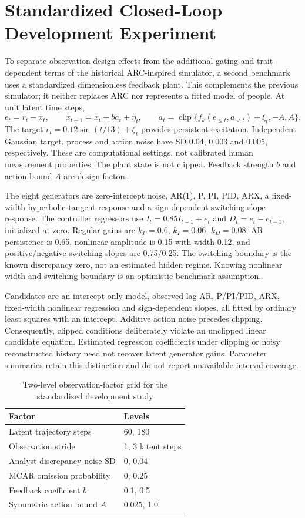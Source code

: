 \section{Standardized Closed-Loop Development Experiment}

To separate observation-design effects from the additional gating and trait-dependent terms of the historical ARC-inspired simulator, a second benchmark uses a standardized dimensionless feedback plant. This complements the previous simulator; it neither replaces ARC nor represents a fitted model of people. At unit latent time steps,
\[
 e_t=r_t-x_t,\qquad x_{t+1}=x_t+b a_t+\eta_t,\qquad
 a_t=\operatorname{clip}\{f_k(e_{\leq t},a_{<t})+\xi_t,-A,A\}.
\]
The target $r_t=0.12\sin(t/13)+\zeta_t$ provides persistent excitation. Independent Gaussian target, process and action noise have SD 0.04, 0.003 and 0.005, respectively. These are computational settings, not calibrated human measurement properties. The plant state is not clipped. Feedback strength $b$ and action bound $A$ are design factors.

The eight generators are zero-intercept noise, AR(1), P, PI, PID, ARX, a fixed-width hyperbolic-tangent response and a sign-dependent switching-slope response. The controller regressors use $I_t=0.85I_{t-1}+e_t$ and $D_t=e_t-e_{t-1}$, initialized at zero. Regular gains are $k_P=0.6$, $k_I=0.06$, $k_D=0.08$; AR persistence is 0.65, nonlinear amplitude is 0.15 with width 0.12, and positive/negative switching slopes are 0.75/0.25. The switching boundary is the known discrepancy zero, not an estimated hidden regime. Knowing nonlinear width and switching boundary is an optimistic benchmark assumption.

Candidates are an intercept-only model, observed-lag AR, P/PI/PID, ARX, fixed-width nonlinear regression and sign-dependent slopes, all fitted by ordinary least squares with an intercept. Additive action noise precedes clipping. Consequently, clipped conditions deliberately violate an unclipped linear candidate equation. Estimated regression coefficients under clipping or noisy reconstructed history need not recover latent generator gains. Parameter summaries retain this distinction and do not report unavailable interval coverage.

\begin{table}[htbp]
\centering
\caption{Two-level observation-factor grid for the standardized development study}
\label{tab:m02-development-design}
\begin{tabular}{ll}
\toprule
Factor & Levels \\
\midrule
Latent trajectory steps & 60, 180 \\
Observation stride & 1, 3 latent steps \\
Analyst discrepancy-noise SD & 0, 0.04 \\
MCAR omission probability & 0, 0.25 \\
Feedback coefficient $b$ & 0.1, 0.5 \\
Symmetric action bound $A$ & 0.025, 1.0 \\
\bottomrule
\end{tabular}
\end{table}


